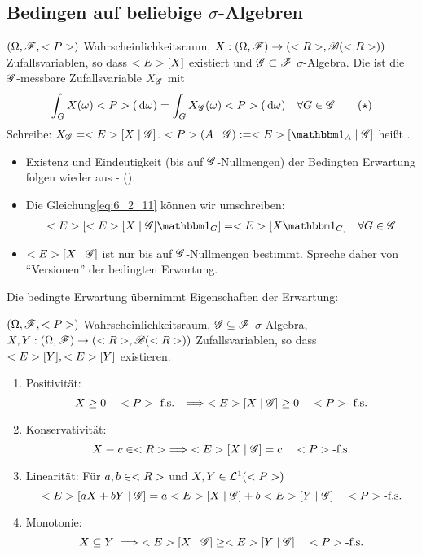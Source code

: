 \subsection*{Bedingen auf beliebige $\sigma$-Algebren}
\begin{definition}[]
	$(\Omega, \mathscr F, <P>)$ Wahrscheinlichkeitsraum, $X: (\Omega, \mathscr F) \to (<R>, \mathscr{B}(<R>))$ Zufallsvariablen, so dass $<E>[X]$ existiert und $\mathscr{G} \subset \mathscr F$ $\sigma$-Algebra. Die  ist die $\mathscr{G}$-messbare Zufallsvariable $X_{\mathscr{G}}$ mit
	\begin{align*}
		\int_G X(\omega)<P>(\,\mathrm{d} \omega) = \int_G X_{\mathscr{G}}(\omega)<P>(\,\mathrm{d} \omega) \quad \forall G \in \mathscr{G} \label{eq:6_2_11}\tag{$\star$}
	\end{align*}
	Schreibe: $X_{\mathscr{G}} = <E>[X \mid \mathscr{G}]$. $\P(A \mid \G) := \E[\indi_A \mid \G]$ heißt .
\end{definition}
\begin{*remark}
	\begin{itemize}
		\item Existenz und Eindeutigkeit (bis auf $\mathscr{G}$-Nullmengen) der Bedingten Erwartung folgen wieder aus - ().
		\item Die Gleichung\eqref{eq:6_2_11} können wir umschreiben:
		\begin{align*}
			\E[\E[X \mid \G]\indi_G] = \E[X \indi_G] \quad \forall G \in \G
		\end{align*}
		\item $<E>[X \mid \mathscr{G}]$ ist nur bis auf $\mathscr{G}$-Nullmengen bestimmt.  Spreche daher von ``Versionen'' der bedingten Erwartung.
	\end{itemize}
\end{*remark}
Die bedingte Erwartung übernimmt Eigenschaften der Erwartung:
\begin{lemma}
	$(\Omega,\mathscr F, <P>)$ Wahrscheinlichkeitsraum, $\mathscr{G} \subseteq \mathscr F$ $\sigma$-Algebra, $X,Y: (\Omega, \mathscr F) \to (<R>, \mathscr{B}(<R>))$ Zufallsvariablen, so dass $<E>[Y],<E>[Y]$ existieren.
	\begin{enumerate}
		\item Positivität:
		\[
			X \ge 0 \quad <P>\text{-f.s. } \implies <E>[X\mid \mathscr{G}] \ge 0\quad <P>\text{-f.s.}
		\]
		\item Konservativität:
		\[
			X \equiv c \in <R> \implies <E>[X \mid \mathscr{G}] = c \quad <P>\text{-f.s.}
		\]
		\item Linearität: Für $a,b \in <R>$ und $X,Y \in \mathcal{L}^{1}(<P>)$
		\[
			<E>[aX + bY \mid \mathscr{G}] = a<E>[X \mid \mathscr{G}] + b <E>[Y \mid \mathscr{G}] \quad <P>\text{-f.s.}
		\]
		\item Monotonie:
		\[
			X \subseteq Y \implies <E>[X \mid \mathscr{G}] \ge <E>[Y \mid \mathscr{G}] \quad <P>\text{-f.s.}
		\]
	\end{enumerate}
\end{lemma}
